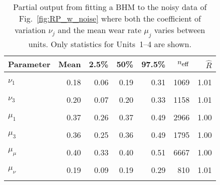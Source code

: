\begin{table}
\centering
\caption{\label{tab:pp_both}Partial output from fitting a BHM to the noisy data of Fig.~\ref{fig:RP_w_noise} where both the coefficient of variation $\nu_j$ and the mean wear rate $\mu_j$ varies between units. Only statistics for Units~1--4 are shown.}
\centering
\begin{tabular}[t]{lrrrrrr}
\toprule
Parameter & Mean & 2.5\% & 50\% & 97.5\% & $n_{\small{\mbox{eff}}}$ & $\hat{R}$\\
\midrule
\cellcolor{gray!10}{$\sigma$} & \cellcolor{gray!10}{0.03} & \cellcolor{gray!10}{0.02} & \cellcolor{gray!10}{0.03} & \cellcolor{gray!10}{0.04} & \cellcolor{gray!10}{1656} & \cellcolor{gray!10}{1.01}\\
$\nu_1$ & 0.18 & 0.06 & 0.19 & 0.31 & 1069 & 1.01\\
\cellcolor{gray!10}{$\nu_2$} & \cellcolor{gray!10}{0.19} & \cellcolor{gray!10}{0.08} & \cellcolor{gray!10}{0.19} & \cellcolor{gray!10}{0.32} & \cellcolor{gray!10}{1353} & \cellcolor{gray!10}{1.01}\\
$\nu_3$ & 0.20 & 0.07 & 0.20 & 0.33 & 1158 & 1.01\\
\cellcolor{gray!10}{$\nu_4$} & \cellcolor{gray!10}{0.20} & \cellcolor{gray!10}{0.07} & \cellcolor{gray!10}{0.20} & \cellcolor{gray!10}{0.33} & \cellcolor{gray!10}{1092} & \cellcolor{gray!10}{1.01}\\
\addlinespace
$\mu_1$ & 0.37 & 0.26 & 0.37 & 0.49 & 2966 & 1.00\\
\cellcolor{gray!10}{$\mu_2$} & \cellcolor{gray!10}{0.44} & \cellcolor{gray!10}{0.33} & \cellcolor{gray!10}{0.43} & \cellcolor{gray!10}{0.60} & \cellcolor{gray!10}{3426} & \cellcolor{gray!10}{1.00}\\
$\mu_3$ & 0.36 & 0.25 & 0.36 & 0.49 & 1795 & 1.00\\
\cellcolor{gray!10}{$\mu_4$} & \cellcolor{gray!10}{0.35} & \cellcolor{gray!10}{0.23} & \cellcolor{gray!10}{0.35} & \cellcolor{gray!10}{0.48} & \cellcolor{gray!10}{1242} & \cellcolor{gray!10}{1.01}\\
$\mu_\mu$ & 0.40 & 0.33 & 0.40 & 0.51 & 6667 & 1.00\\
\addlinespace
\cellcolor{gray!10}{$\sigma_\mu$} & \cellcolor{gray!10}{0.07} & \cellcolor{gray!10}{0.01} & \cellcolor{gray!10}{0.07} & \cellcolor{gray!10}{0.19} & \cellcolor{gray!10}{451} & \cellcolor{gray!10}{1.01}\\
$\mu_\nu$ & 0.19 & 0.09 & 0.19 & 0.29 & 810 & 1.01\\
\cellcolor{gray!10}{$\sigma_\nu$} & \cellcolor{gray!10}{0.04} & \cellcolor{gray!10}{0.00} & \cellcolor{gray!10}{0.03} & \cellcolor{gray!10}{0.11} & \cellcolor{gray!10}{808} & \cellcolor{gray!10}{1.01}\\
\bottomrule
\end{tabular}
\end{table}
